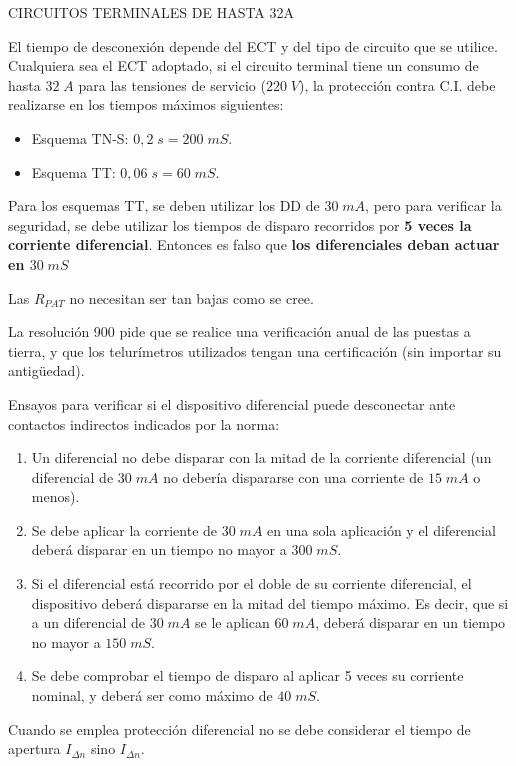 CIRCUITOS TERMINALES DE HASTA 32A

El tiempo de desconexión depende del ECT y del tipo de circuito que se utilice.
Cualquiera sea el ECT adoptado, si el circuito terminal tiene un consumo de hasta $32\; A$ para las tensiones de servicio ($220\; V$), la protección contra C.I. debe realizarse en los tiempos máximos siguientes:

\begin{itemize}
	\item Esquema TN-S: $0,2\; s=200\; mS$.
	\item Esquema TT: $0,06\; s=60\; mS$.
\end{itemize} 

Para los esquemas TT, se deben utilizar los DD de $30\; mA$, pero para verificar la seguridad, se debe utilizar los tiempos de disparo recorridos por \textbf{5 veces la corriente diferencial}. Entonces es falso que \textbf{los diferenciales deban actuar en $30\; mS$}

Las $R_{PAT}$ no necesitan ser tan bajas como se cree.

La resolución 900 pide que se realice una verificación anual de las puestas a tierra, y que los telurímetros utilizados tengan una certificación (sin importar su antigüedad).

Ensayos para verificar si el dispositivo diferencial puede desconectar ante contactos indirectos indicados por la norma:
\begin{enumerate}
	\item Un diferencial no debe disparar con la mitad de la corriente diferencial (un diferencial de $30\; mA$ no debería dispararse con una corriente de $15\; mA$ o menos).
	\item Se debe aplicar la corriente de $30\; mA$ en una sola aplicación y el diferencial deberá disparar en un tiempo no mayor a $300\; mS$.
	\item Si el diferencial está recorrido por el doble de su corriente diferencial, el dispositivo deberá dispararse en la mitad del tiempo máximo. Es decir, que si a un diferencial de $30\; mA$ se le aplican $60\; mA$, deberá disparar en un tiempo no mayor a $150\; mS$.
	\item Se debe comprobar el tiempo de disparo al aplicar 5 veces su corriente nominal, y deberá ser como máximo de $40\; mS$.
\end{enumerate}

Cuando se emplea protección diferencial no se debe considerar el tiempo de apertura $I_{\Delta n}$ sino $I_{\Delta n}$.

